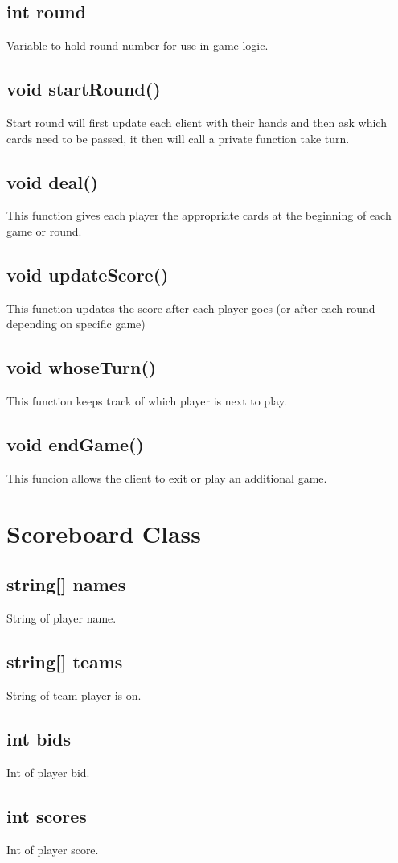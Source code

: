 \documentclass[]{scrartcl}
\begin{document}
\subsection{int round}
	Variable to hold round number for use in game logic.
\subsection{void startRound()}
	Start round will first update each client with their hands and then ask which cards need to be passed, it then will call a private function take turn.  
\subsection{void deal()}
	This function gives each player the appropriate cards at the beginning of each game or round.
\subsection{void updateScore()}
	This function updates the score after each player goes (or after each round depending on specific game)
\subsection{void whoseTurn()}
	This function keeps track of which player is next to play.
\subsection{void endGame()}
	This funcion allows the client to exit or play an additional game.

\section{Scoreboard Class}

\subsection{string[] names}
	String of player name.
\subsection{string[] teams}
	String of team player is on.
\subsection{int bids}
	Int of player bid.
\subsection{int scores}
	Int of player score.
\end{document}
